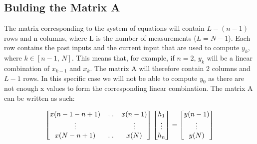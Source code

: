 \documentclass{article}
\begin{document}
\subsection{Bulding the Matrix A}
\begin{flushleft}
The matrix corresponding to the system of equations will contain \begin{math} L-(n-1) \end{math} rows and n columns, where L is the number of measurements (\begin{math} L = N-1 \end{math}).
Each row contains the past inputs and the current input that are used to compute \begin{math} y_{k} \end{math}, where \begin{math} k \in [n-1,\, N] \end{math}.
This means that, for example, if \begin{math} n = 2 \end{math}, \begin{math} y_{k} \end{math} will be a linear combination of \begin{math} x_{k-1} \end{math} and \begin{math}x_{k}\end{math}. The matrix A will therefore contain 2 columns and \begin{math} L-1 \end{math} rows. In this specific case we will not be able to compute \begin{math} y_{0} \end{math} as there are not enough x values to form the corresponding linear combination.
\break The matrix A can be written as such:
\vspace{0.5cm}
\end{flushleft}
\[
\begin{bmatrix}
    x(n-1-n+1) & \hdotsfor{2} & x(n-1) \\
    \vdots & \empty & \empty & \vdots \\
    x(N-n+1) & \hdotsfor{2} & x(N)
\end{bmatrix}
\begin{bmatrix}
    h_{1} \\
    \vdots \\
    h_{n}
\end{bmatrix}
=
\begin{bmatrix}
    y(n-1) \\
    \vdots \\
    y(N)
\end{bmatrix}
\]
\end{document}
